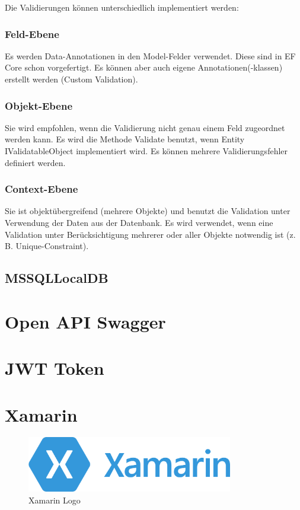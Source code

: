 Die Validierungen können unterschiedlich implementiert werden:

\subsubsection{Feld-Ebene}
Es werden Data-Annotationen in den Model-Felder verwendet. Diese sind in EF Core schon vorgefertigt. Es können aber auch eigene
Annotationen(-klassen) erstellt werden (Custom Validation).

\subsubsection{Objekt-Ebene}
Sie wird empfohlen, wenn die Validierung nicht genau einem Feld zugeordnet werden kann.
Es wird die Methode Validate benutzt, wenn Entity IValidatableObject implementiert wird. Es können
mehrere Validierungsfehler definiert werden.

\subsubsection{Context-Ebene}
Sie ist objektübergreifend (mehrere Objekte) und benutzt die Validation unter Verwendung
der Daten aus der Datenbank.
Es wird verwendet, wenn eine Validation unter Berücksichtigung mehrerer oder aller Objekte
notwendig ist (z. B. Unique-Constraint).

\subsection{MSSQLLocalDB}


\section{Open API Swagger}


\section{JWT Token}

\newpage

\section{Xamarin}
\cite{XML}
\begin{figure}[h]
    \begin{center}
        \includegraphics*[width=9cm]{pics/Xamarin_logo.png}
        \caption[Xamarin Logo]{Xamarin Logo \cite{XMLlogo}}
    \end{center}
\end{figure}

